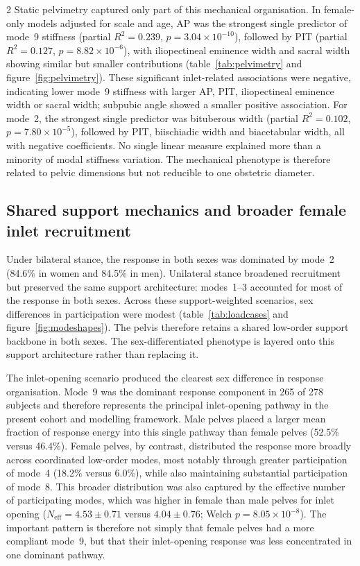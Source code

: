 \documentclass[openacc]{rsproca_new}
\begin{document}
\begin{multicols}{2}
Static pelvimetry captured only part of this mechanical organisation. In female-only models adjusted for scale and age, AP was the strongest single predictor of mode~9 stiffness (partial $R^2=0.239$, $p=3.04 \times 10^{-10}$), followed by PIT (partial $R^2=0.127$, $p=8.82 \times 10^{-6}$), with iliopectineal eminence width and sacral width showing similar but smaller contributions (table~\ref{tab:pelvimetry} and figure~\ref{fig:pelvimetry}). These significant inlet-related associations were negative, indicating lower mode~9 stiffness with larger AP, PIT, iliopectineal eminence width or sacral width; subpubic angle showed a smaller positive association. For mode~2, the strongest single predictor was bituberous width (partial $R^2=0.102$, $p=7.80 \times 10^{-5}$), followed by PIT, biischiadic width and biacetabular width, all with negative coefficients. No single linear measure explained more than a minority of modal stiffness variation. The mechanical phenotype is therefore related to pelvic dimensions but not reducible to one obstetric diameter.

\subsection{Shared support mechanics and broader female inlet recruitment}

Under bilateral stance, the response in both sexes was dominated by mode~2 (84.6\% in women and 84.5\% in men). Unilateral stance broadened recruitment but preserved the same support architecture: modes~1--3 accounted for most of the response in both sexes. Across these support-weighted scenarios, sex differences in participation were modest (table~\ref{tab:loadcases} and figure~\ref{fig:modeshapes}). The pelvis therefore retains a shared low-order support backbone in both sexes. The sex-differentiated phenotype is layered onto this support architecture rather than replacing it.

The inlet-opening scenario produced the clearest sex difference in response organisation. Mode~9 was the dominant response component in 265 of 278 subjects and therefore represents the principal inlet-opening pathway in the present cohort and modelling framework. Male pelves placed a larger mean fraction of response energy into this single pathway than female pelves (52.5\% versus 46.4\%). Female pelves, by contrast, distributed the response more broadly across coordinated low-order modes, most notably through greater participation of mode~4 (18.2\% versus 6.0\%), while also maintaining substantial participation of mode~8. This broader distribution was also captured by the effective number of participating modes, which was higher in female than male pelves for inlet opening ($N_{\mathrm{eff}}=4.53\pm0.71$ versus $4.04\pm0.76$; Welch $p=8.05\times10^{-8}$). The important pattern is therefore not simply that female pelves had a more compliant mode~9, but that their inlet-opening response was less concentrated in one dominant pathway.


\end{multicols}
\end{document}
